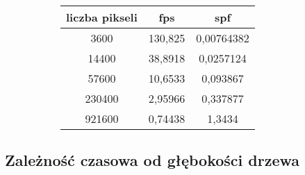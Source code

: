 \begin{figure}[!ht]
\advance\leftskip-2cm
\begin{subfigure}{.5\textwidth}
\end{subfigure}
\hspace{2cm}
\begin{subfigure}{.5\textwidth}
		\begin{longtable}{|c|c|c|} \hline
	    liczba pikseli & fps & spf \\ \hline
	    3600 & 130,825 & 0,00764382 \\ 
	    14400 &	38,8918 & 0,0257124 \\
		57600 & 10,6533 & 0,093867 \\
		230400 & 2,95966 & 0,337877 \\
		921600 & 0,74438 & 1,3434 \\
		\hline
		\end{longtable}
\end{subfigure}
\end{figure}

\subsection{Zależność czasowa od głębokości drzewa}

